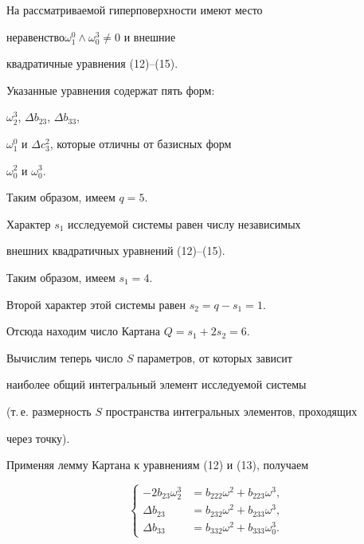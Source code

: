 \begin{pf}


На рассматриваемой гиперповерхности имеют место


неравенство\linebreak $\omega^0_1 \wedge \omega^3_0 \neq 0$ и внешние


квадратичные уравнения (12)--(15).


Указанные уравнения содержат пять форм:


$\omega_2^3$, $\Delta b_{23}$, $\Delta b_{33}$,


$\omega_1^0$ и $\Delta c_{3}^2$, которые отличны от базисных форм


$\omega_0^2$ и $\omega_0^3$.


Таким образом, имеем $q = 5$.





Характер $s_1$ исследуемой системы равен числу независимых


внешних квадратичных уравнений (12)--(15).


Таким образом, имеем $s_1 = 4$.


Второй характер этой системы равен $s_2 = q - s_1 = 1$.


Отсюда находим число Картана $Q = s_1 + 2 s_2 = 6$.





Вычислим теперь число $S$ параметров, от которых зависит


наиболее общий интегральный элемент исследуемой системы


(т.\,е. размерность $S$ пространства интегральных элементов, проходящих


через точку).


Применяя лемму Картана к уравнениям (12) и (13), получаем


\begin{equation}\label{eq:22}


\left\{


\begin{split}


- 2b_{23} \omega_2^3 &= b_{222} \omega^2 + b_{223}\omega^3, \\


\Delta b_{23} &= b_{232} \omega^2 + b_{233}\omega^3, \\


\Delta b_{33} &= b_{332} \omega^2 + b_{333}\omega^3_0.


\end{split}



\end{equation}
\end{pf}
